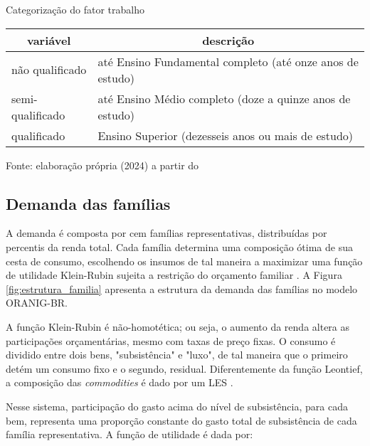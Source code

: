 \begin{quadro}[h]
	\centering
	\begin{threeparttable}
		\caption{Categorização do fator trabalho} \label{quad:categoria_trabalho}
		\footnotesize
		\begin{tabular}{|| m{3cm} | m{9cm} ||}
			\hline \hline
			\multicolumn{1}{||c|}{\textbf{variável}} & \multicolumn{1}{c||}{\textbf{descrição}} \\ \hline
			não qualificado  & até Ensino Fundamental completo (até onze anos de estudo) \\ \hline 
			semi-qualificado & até Ensino Médio completo (doze a quinze anos de estudo) \\ \hline
			qualificado      & Ensino Superior (dezesseis anos ou mais de estudo) \\ \hline \hline
		\end{tabular}
		\begin{tablenotes}
			\scriptsize
			\item Fonte: elaboração própria (2024) a partir do \textcite{inep04}
		\end{tablenotes}
	\end{threeparttable}
\end{quadro}

\subsection{Demanda das famílias} \label{subsec:demanda_familias}

A demanda é composta por cem famílias representativas, distribuídas por percentis da renda total. Cada família determina uma composição ótima de sua cesta de consumo, escolhendo os insumos de tal maneira a maximizar uma função de utilidade Klein-Rubin sujeita a restrição do orçamento familiar \cite{horridge03}. A Figura \ref{fig:estrutura_familia} apresenta a estrutura da demanda das famílias no modelo ORANIG-BR.

A função Klein-Rubin é não-homotética; ou seja, o aumento da renda altera as participações orçamentárias, mesmo com taxas de preço fixas. O consumo é dividido entre dois bens, "subsistência" e "luxo", de tal maneira que o primeiro detém um consumo fixo e o segundo, residual. Diferentemente da função Leontief, a composição das \textit{commodities} é dado por um LES \cite{horridge03}.

Nesse sistema, participação do gasto acima do nível de subsistência, para cada bem, representa uma proporção constante do gasto total de subsistência de cada família representativa. A função de utilidade é dada por:

